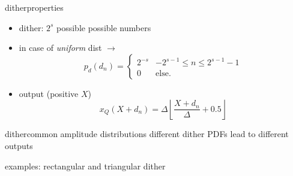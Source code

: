 	\begin{frame}{dither}{properties}
		\begin{figure}
			\centering
				
		\end{figure}
        \pause
        \begin{itemize}
            \item   dither: $2^s$ possible possible numbers
            \pause
            \item   in case of \textit{uniform} dist  $\rightarrow$
            \begin{equation*}
                 p_d(d_n) = \left\lbrace \begin{array}{ll}
                    2^{-s} & -2^{s-1}\leq n \leq 2^{s-1}-1\\
                    0 & \text{else}.
                \end{array}\right.
            \end{equation*}
            \pause
            \item   output (positive $X$)
            \begin{equation*}
                x_Q(X + d_n) = \Delta\left\lfloor \frac{X + d_n}{\Delta} + 0.5 \right\rfloor
            \end{equation*}
        \end{itemize}
	\end{frame}	
	\begin{frame}{dither}{common amplitude distributions}
        different dither PDFs lead to different outputs
        
        examples: rectangular and triangular dither
	\end{frame}	
